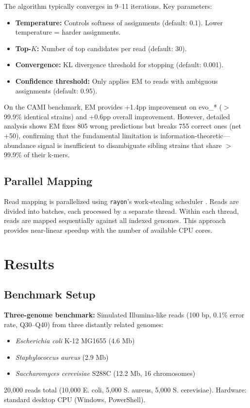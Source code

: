 \documentclass{article}
\begin{document}
The algorithm typically converges in 9--11 iterations. Key parameters:
\begin{itemize}
    \item \textbf{Temperature:} Controls softness of assignments (default: 0.1). Lower temperature = harder assignments.
    \item \textbf{Top-$K$:} Number of top candidates per read (default: 30).
    \item \textbf{Convergence:} KL divergence threshold for stopping (default: 0.001).
    \item \textbf{Confidence threshold:} Only applies EM to reads with ambiguous assignments (default: 0.95).
\end{itemize}

On the CAMI benchmark, EM provides +1.4pp improvement on evo\_* ($>$99.9\% identical strains) and +0.6pp overall improvement. However, detailed analysis shows EM fixes 805 wrong predictions but breaks 755 correct ones (net +50), confirming that the fundamental limitation is information-theoretic---abundance signal is insufficient to disambiguate sibling strains that share $>$99.9\% of their k-mers.

\subsection{Parallel Mapping}

Read mapping is parallelized using \texttt{rayon}'s work-stealing scheduler \citep{rayon}. Reads are divided into batches, each processed by a separate thread. Within each thread, reads are mapped sequentially against all indexed genomes. This approach provides near-linear speedup with the number of available CPU cores.

\section{Results}

\subsection{Benchmark Setup}

\textbf{Three-genome benchmark:} Simulated Illumina-like reads (100 bp, 0.1\% error rate, Q30--Q40) from three distantly related genomes:
\begin{itemize}
    \item \textit{Escherichia coli} K-12 MG1655 (4.6 Mb)
    \item \textit{Staphylococcus aureus} (2.9 Mb)
    \item \textit{Saccharomyces cerevisiae} S288C (12.2 Mb, 16 chromosomes)
\end{itemize}
20,000 reads total (10,000 E. coli, 5,000 S. aureus, 5,000 S. cerevisiae). Hardware: standard desktop CPU (Windows, PowerShell).
\end{document}
